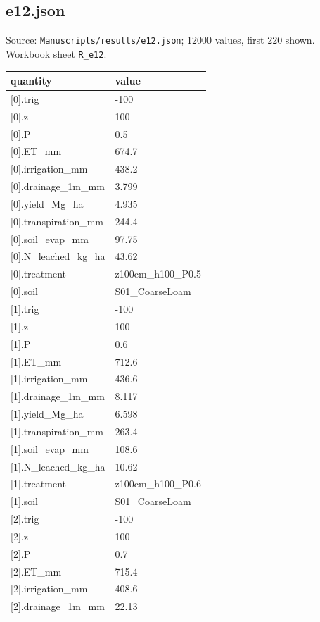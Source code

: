 \subsection*{e12.json}
\noindent\small Source: \nolinkurl{Manuscripts/results/e12.json}; 12000 values, first 220 shown. Workbook sheet \texttt{R\_e12}.\par
{\scriptsize\begin{longtable}{p{}p{}}\toprule\textbf{quantity} & \textbf{value}\\\midrule\endhead
{}[0].trig & -100\\
{}[0].z & 100\\
{}[0].P & 0.5\\
{}[0].ET\_mm & 674.7\\
{}[0].irrigation\_mm & 438.2\\
{}[0].drainage\_1m\_mm & 3.799\\
{}[0].yield\_Mg\_ha & 4.935\\
{}[0].transpiration\_mm & 244.4\\
{}[0].soil\_evap\_mm & 97.75\\
{}[0].N\_leached\_kg\_ha & 43.62\\
{}[0].treatment & z100cm\_h100\_P0.5\\
{}[0].soil & S01\_CoarseLoam\\
{}[1].trig & -100\\
{}[1].z & 100\\
{}[1].P & 0.6\\
{}[1].ET\_mm & 712.6\\
{}[1].irrigation\_mm & 436.6\\
{}[1].drainage\_1m\_mm & 8.117\\
{}[1].yield\_Mg\_ha & 6.598\\
{}[1].transpiration\_mm & 263.4\\
{}[1].soil\_evap\_mm & 108.6\\
{}[1].N\_leached\_kg\_ha & 10.62\\
{}[1].treatment & z100cm\_h100\_P0.6\\
{}[1].soil & S01\_CoarseLoam\\
{}[2].trig & -100\\
{}[2].z & 100\\
{}[2].P & 0.7\\
{}[2].ET\_mm & 715.4\\
{}[2].irrigation\_mm & 408.6\\
{}[2].drainage\_1m\_mm & 22.13\\

\end{longtable}}

